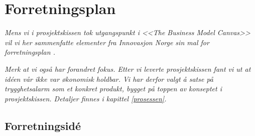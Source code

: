 %
%
%
%





\chapter{Forretningsplan}

\textit{Mens vi i prosjektskissen tok utgangspunkt i \textit{<<The Business
Model Canvas>>} \cite{osterwalder} vil vi her sammenfatte elementer fra
Innovasjon Norge sin mal for forretningsplan \cite{innovasjon.norge}.}

\textit{Merk at vi også har forandret fokus. Etter vi leverte
  prosjektskissen fant vi ut at idéen vår ikke var økonomisk holdbar. Vi har
  derfor valgt å satse på trygghetsalarm som et konkret produkt, bygget på
  toppen av konseptet i prosjektskissen. Detaljer finnes i kapittel
\vref{prosessen}.}

\section{Forretningsidé}

